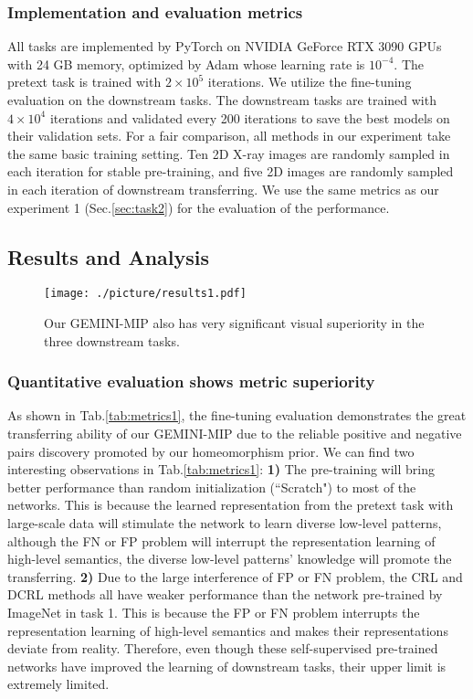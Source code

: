 \subsubsection{Implementation and evaluation metrics} All tasks are implemented by PyTorch \cite{paszke2019pytorch} on NVIDIA GeForce RTX 3090 GPUs with 24 GB memory, optimized by Adam \cite{kingma2014adam} whose learning rate is $10^{-4}$. The pretext task is trained with $2\times10^{5}$ iterations. We utilize the fine-tuning evaluation on the downstream tasks. The downstream tasks are trained with $4\times10^{4}$ iterations and validated every 200 iterations to save the best models on their validation sets. For a fair comparison, all methods in our experiment take the same basic training setting. Ten 2D X-ray images are randomly sampled in each iteration for stable pre-training, and five 2D images are randomly sampled in each iteration of downstream transferring. We use the same metrics as our experiment 1 (Sec.\ref{sec:task2}) for the evaluation of the performance.

\subsection{Results and Analysis}
\label{sec:results1}
\begin{figure}
  \centering
  \texttt{[image: ./picture/results1.pdf]}
  \caption{Our GEMINI-MIP also has very significant visual superiority in the three downstream tasks.}\label{Fig:results1}
\end{figure}

\subsubsection{Quantitative evaluation shows metric superiority}
As shown in Tab.\ref{tab:metrics1}, the fine-tuning evaluation demonstrates the great transferring ability of our GEMINI-MIP due to the reliable positive and negative pairs discovery promoted by our homeomorphism prior. We can find two interesting observations in Tab.\ref{tab:metrics1}: \textbf{1)} The pre-training will bring better performance than random initialization (``Scratch") to most of the networks. This is because the learned representation from the pretext task with large-scale data will stimulate the network to learn diverse low-level patterns, although the FN or FP problem will interrupt the representation learning of high-level semantics, the diverse low-level patterns' knowledge will promote the transferring. \textbf{2)} Due to the large interference of FP or FN problem, the CRL and DCRL methods all have weaker performance than the network pre-trained by ImageNet in task 1. This is because the FP or FN problem interrupts the representation learning of high-level semantics and makes their representations deviate from reality. Therefore, even though these self-supervised pre-trained networks have improved the learning of downstream tasks, their upper limit is extremely limited.

